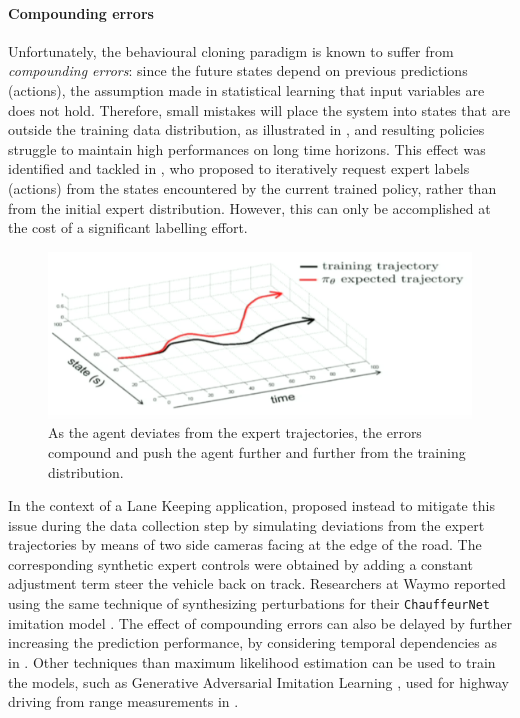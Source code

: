 \paragraph{Compounding errors} Unfortunately, the behavioural cloning paradigm is known to suffer from \emph{compounding errors}: since the future states depend on previous predictions (actions), the assumption made in statistical learning that input variables are \iid does not hold. Therefore, small mistakes will place the system into states that are outside the training data distribution, as illustrated in , and resulting policies struggle to maintain high performances on long time horizons. This effect was identified and tackled in \citep{Ross2011}, who proposed to iteratively request expert labels (actions) from the states encountered by the current trained policy, rather than from the initial expert distribution. However, this can only be accomplished at the cost of a significant labelling effort. 
\begin{figure}[th]
	\centering
	\includegraphics[width=0.7\linewidth]{img/cp4}
	\caption{As the agent deviates from the expert trajectories, the errors compound and push the agent further and further from the training distribution.}
	\label{fig:compounding}
\end{figure}
In the context of a Lane Keeping application, \citet{Bojarski2016} proposed instead to mitigate this issue during the data collection step by simulating deviations from the expert trajectories by means of two side cameras facing at the edge of the road. The corresponding synthetic expert controls were obtained by adding a constant adjustment term steer the vehicle back on track. Researchers at Waymo reported using the same technique of synthesizing perturbations for their \texttt{ChauffeurNet} imitation model \citep{Bansal2018}. The effect of compounding errors can also be delayed by further increasing the prediction performance, \eg by considering temporal dependencies as in \citep{Eraqi2017,Xu2017}. Other techniques than maximum likelihood estimation can be used to train the models, such as Generative Adversarial Imitation Learning \citep{Ho2016}, used for highway driving from range measurements in \citep{Kuefler2017,Bhattacharyya2018}.

